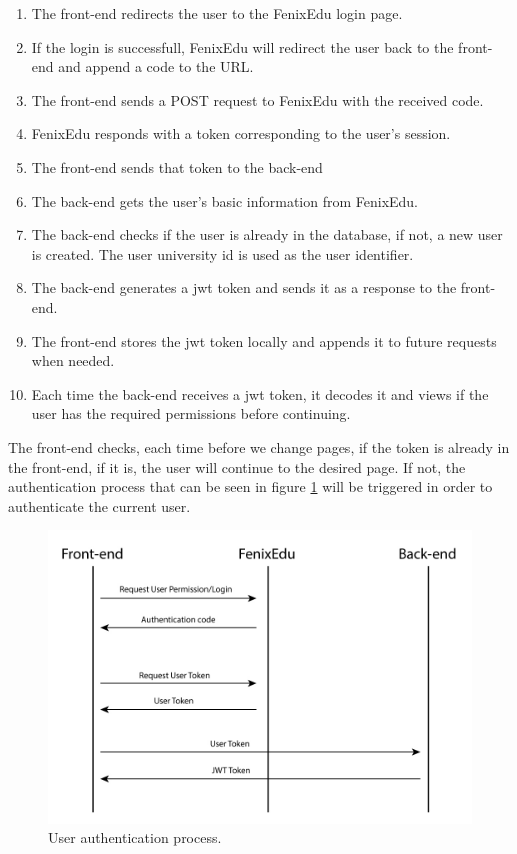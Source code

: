 \begin{enumerate}
    \item The front-end redirects the user to the FenixEdu login page.
    \item If the login is successfull, FenixEdu will redirect the user back to the front-end and append a code to the URL.
    \item The front-end sends a POST request to FenixEdu with the received code.
    \item FenixEdu responds with a token corresponding to the user's session.
    \item The front-end sends that token to the back-end
    \item The back-end gets the user's basic information from FenixEdu.
    \item The back-end checks if the user is already in the database, if not, a new user is created. The user university id is used as the user identifier.
    \item The back-end generates a jwt token and sends it as a response to the front-end.
    \item The front-end stores the jwt token locally and appends it to future requests when needed.
    \item Each time the back-end receives a jwt token, it decodes it and views if the user has the required permissions before continuing.
\end{enumerate}

The front-end checks, each time before we change pages, if the token is already in the front-end, if it is, the user will continue to the desired page. If not, the authentication process that can be seen in figure \ref{securityFlow} will be triggered in order to authenticate the current user.


\begin{figure}[h!]
    \centering
    \includegraphics[scale=0.24]{images/Security/securityFlow.jpg}
    \caption[Login process]{User authentication process.}
    \label{securityFlow}
\end{figure}

